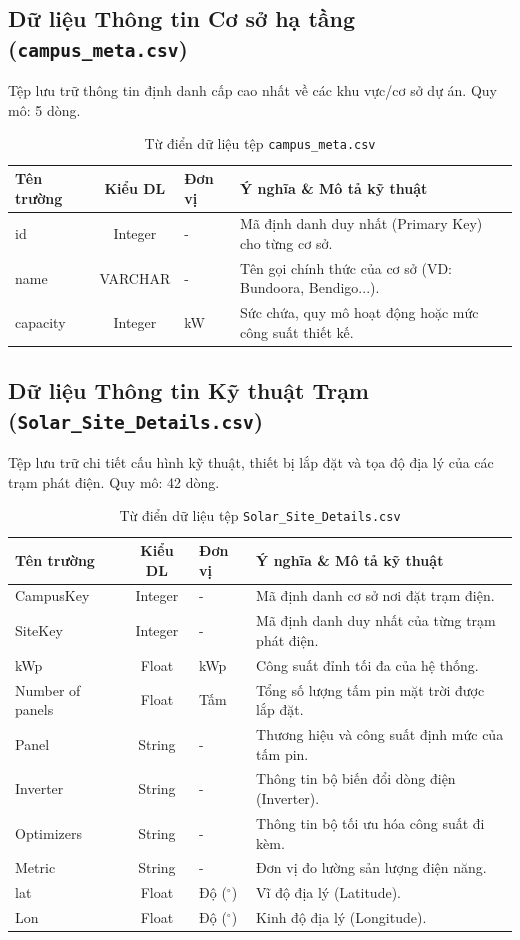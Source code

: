 \documentclass[12pt, a4paper]{report}
\begin{document}
\subsection{Dữ liệu Thông tin Cơ sở hạ tầng (\texttt{campus\_meta.csv})}
Tệp lưu trữ thông tin định danh cấp cao nhất về các khu vực/cơ sở dự án. Quy mô: 5 dòng.
\begin{table}[H]
\centering
\caption{Từ điển dữ liệu tệp \texttt{campus\_meta.csv}}
\renewcommand{\arraystretch}{1.4}
\begin{tabularx}{\textwidth}{p{3.5cm} c p{2cm} X}
\toprule
\textbf{Tên trường} & \textbf{Kiểu DL} & \textbf{Đơn vị} & \textbf{Ý nghĩa \& Mô tả kỹ thuật} \\
\midrule
id       & Integer & -  & Mã định danh duy nhất (Primary Key) cho từng cơ sở. \\
name     & VARCHAR  & -  & Tên gọi chính thức của cơ sở (VD: Bundoora, Bendigo...). \\
capacity & Integer & kW & Sức chứa, quy mô hoạt động hoặc mức công suất thiết kế. \\
\bottomrule
\end{tabularx}
\end{table}

\newpage
\subsection{Dữ liệu Thông tin Kỹ thuật Trạm (\texttt{Solar\_Site\_Details.csv})}
Tệp lưu trữ chi tiết cấu hình kỹ thuật, thiết bị lắp đặt và tọa độ địa lý của các trạm phát điện. Quy mô: 42 dòng.
\begin{table}[H]
\centering
\caption{Từ điển dữ liệu tệp \texttt{Solar\_Site\_Details.csv}}
\renewcommand{\arraystretch}{1.4}
\begin{tabularx}{\textwidth}{p{3.5cm} c p{2cm} X}
\toprule
\textbf{Tên trường} & \textbf{Kiểu DL} & \textbf{Đơn vị} & \textbf{Ý nghĩa \& Mô tả kỹ thuật} \\
\midrule
CampusKey        & Integer & -   & Mã định danh cơ sở nơi đặt trạm điện. \\
SiteKey          & Integer & -   & Mã định danh duy nhất của từng trạm phát điện. \\
kWp              & Float   & kWp & Công suất đỉnh tối đa của hệ thống. \\
Number of panels & Float   & Tấm & Tổng số lượng tấm pin mặt trời được lắp đặt. \\
Panel            & String  & -   & Thương hiệu và công suất định mức của tấm pin. \\
Inverter         & String  & -   & Thông tin bộ biến đổi dòng điện (Inverter). \\
Optimizers       & String  & -   & Thông tin bộ tối ưu hóa công suất đi kèm. \\
Metric           & String  & -   & Đơn vị đo lường sản lượng điện năng. \\
lat              & Float   & Độ ($^\circ$) & Vĩ độ địa lý (Latitude). \\
Lon              & Float   & Độ ($^\circ$) & Kinh độ địa lý (Longitude). \\
\bottomrule
\end{tabularx}
\end{table}
\end{document}
